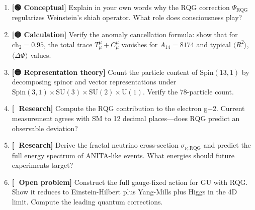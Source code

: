 \begin{enumerate}
\item \textbf{[🟢 Conceptual]} Explain in your own words why the RQG correction $\Psi_{\text{RQG}}$ regularizes Weinstein's shiab operator. What role does consciousness play?

\item \textbf{[🟡 Calculation]} Verify the anomaly cancellation formula: show that for $\text{ch}_2 = 0.95$, the total trace $T^\mu_\mu + C^\mu_\mu$ vanishes for $A_{14} = 8174$ and typical $\langle R^2 \rangle$, $\langle \Delta \Phi \rangle$ values.

\item \textbf{[🟡 Representation theory]} Count the particle content of $\text{Spin}(13,1)$ by decomposing spinor and vector representations under $\text{Spin}(3,1) \times \text{SU}(3) \times \text{SU}(2) \times \text{U}(1)$. Verify the 78-particle count.

\item \textbf{[🔴 Research]} Compute the RQG contribution to the electron g−2. Current measurement agrees with SM to 12 decimal places—does RQG predict an observable deviation?

\item \textbf{[🔴 Research]} Derive the fractal neutrino cross-section $\sigma_{\nu,\text{RQG}}$ and predict the full energy spectrum of ANITA-like events. What energies should future experiments target?

\item \textbf{[🔴 Open problem]} Construct the full gauge-fixed action for GU with RQG. Show it reduces to Einstein-Hilbert plus Yang-Mills plus Higgs in the 4D limit. Compute the leading quantum corrections.
\end{enumerate}
